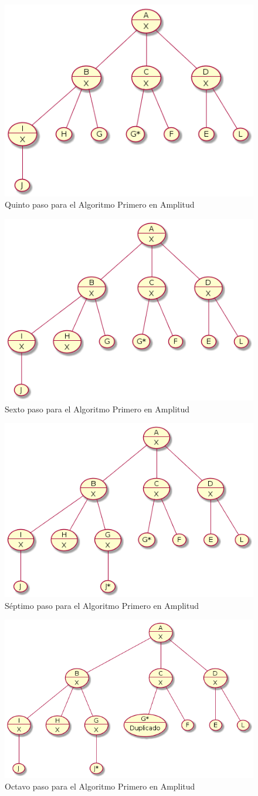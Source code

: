 \documentclass{article}
\begin{document}
\begin{figure}[H]
  \centering
  \includegraphics[width=.4\linewidth]{EJ4/ej4_004.png}
  \caption{Quinto paso para el Algoritmo Primero en Amplitud}
  \label{gr:g18}
\end{figure}

\begin{figure}[H]
  \centering
  \includegraphics[width=.4\linewidth]{EJ4/ej4_005.png}
  \caption{Sexto paso para el Algoritmo Primero en Amplitud}
  \label{gr:g19}
\end{figure}

\begin{figure}[H]
  \centering
  \includegraphics[width=.4\linewidth]{EJ4/ej4_006.png}
  \caption{S\'eptimo paso para el Algoritmo Primero en Amplitud}
  \label{gr:g20}
\end{figure}

\begin{figure}[H]
  \centering
  \includegraphics[width=.4\linewidth]{EJ4/ej4_007.png}
  \caption{Octavo paso para el Algoritmo Primero en Amplitud}
  \label{gr:g21}
\end{figure}
\end{document}
